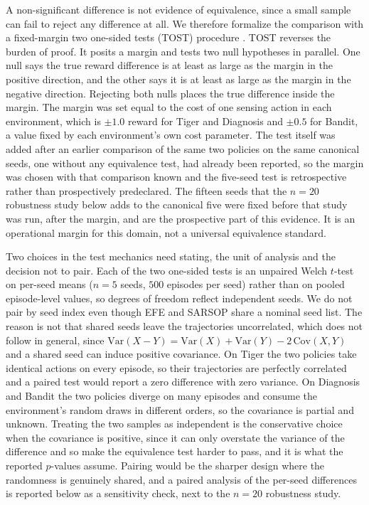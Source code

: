 A non-significant difference is not evidence of equivalence, since a small sample can fail to reject any difference at all. We therefore formalize the comparison with a fixed-margin two one-sided tests (TOST) procedure \citep{schuirmann1987}. TOST reverses the burden of proof. It posits a margin and tests two null hypotheses in parallel. One null says the true reward difference is at least as large as the margin in the positive direction, and the other says it is at least as large as the margin in the negative direction. Rejecting both nulls places the true difference inside the margin. The margin was set equal to the cost of one sensing action in each environment, which is $\pm 1.0$ reward for Tiger and Diagnosis and $\pm 0.5$ for Bandit, a value fixed by each environment's own cost parameter. The test itself was added after an earlier comparison of the same two policies on the same canonical seeds, one without any equivalence test, had already been reported, so the margin was chosen with that comparison known and the five-seed test is retrospective rather than prospectively predeclared. The fifteen seeds that the $n{=}20$ robustness study below adds to the canonical five were fixed before that study was run, after the margin, and are the prospective part of this evidence. It is an operational margin for this domain, not a universal equivalence standard.

Two choices in the test mechanics need stating, the unit of analysis and the decision not to pair. Each of the two one-sided tests is an unpaired Welch $t$-test on per-seed means ($n{=}5$ seeds, $500$ episodes per seed) rather than on pooled episode-level values, so degrees of freedom reflect independent seeds. We do not pair by seed index even though EFE and SARSOP share a nominal seed list. The reason is not that shared seeds leave the trajectories uncorrelated, which does not follow in general, since $\mathrm{Var}(X - Y) = \mathrm{Var}(X) + \mathrm{Var}(Y) - 2\,\mathrm{Cov}(X, Y)$ and a shared seed can induce positive covariance. On Tiger the two policies take identical actions on every episode, so their trajectories are perfectly correlated and a paired test would report a zero difference with zero variance. On Diagnosis and Bandit the two policies diverge on many episodes and consume the environment's random draws in different orders, so the covariance is partial and unknown. Treating the two samples as independent is the conservative choice when the covariance is positive, since it can only overstate the variance of the difference and so make the equivalence test harder to pass, and it is what the reported $p$-values assume. Pairing would be the sharper design where the randomness is genuinely shared, and a paired analysis of the per-seed differences is reported below as a sensitivity check, next to the $n{=}20$ robustness study.

